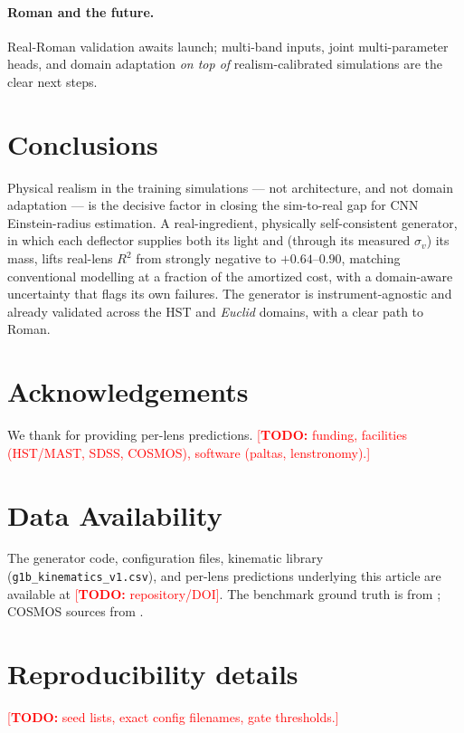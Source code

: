 \documentclass[fleqn,usenatbib]{mnras}
\newcommand{\sigmav}{\sigma_{v}}
\newcommand{\todo}[1]{\textcolor{red}{[\textbf{TODO:} #1]}}
\begin{document}
\paragraph*{Roman and the future.} Real-Roman validation awaits launch;
multi-band inputs, joint multi-parameter heads, and domain adaptation
\emph{on top of} realism-calibrated simulations are the clear next steps.

\section{Conclusions}
\label{sec:conclusions}
Physical realism in the training simulations --- not architecture, and not
domain adaptation --- is the decisive factor in closing the sim-to-real gap for
CNN Einstein-radius estimation. A real-ingredient, physically self-consistent
generator, in which each deflector supplies both its light and (through its
measured $\sigmav$) its mass, lifts real-lens $R^2$ from strongly negative to
$+0.64$--$0.90$, matching conventional modelling at a fraction of the amortized
cost, with a domain-aware uncertainty that flags its own failures. The generator
is instrument-agnostic and already validated across the HST and \textit{Euclid}
domains, with a clear path to Roman.

\section*{Acknowledgements}
We thank \citet{Cao2025} for providing per-lens predictions. \todo{funding,
facilities (HST/MAST, SDSS, COSMOS), software (paltas, lenstronomy).}

\section*{Data Availability}
The generator code, configuration files, kinematic library
(\texttt{g1b\_kinematics\_v1.csv}), and per-lens predictions underlying this
article are available at \todo{repository/DOI}. The benchmark ground truth is
from \citet{Bolton2008}; COSMOS sources from \citet{Mandelbaum2012}.




\appendix
\section{Reproducibility details}
\todo{seed lists, exact config filenames, gate thresholds.}

\bsp
\label{lastpage}
\end{document}
